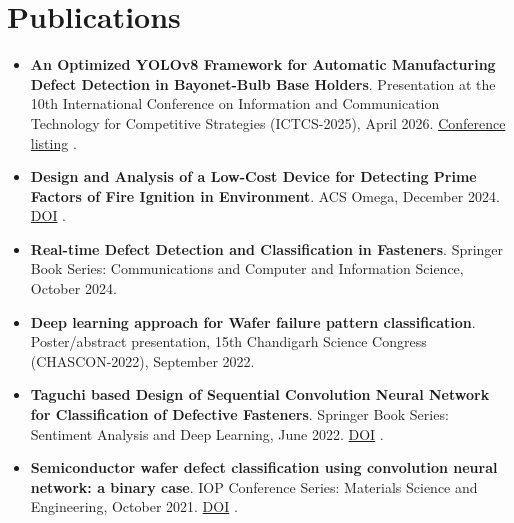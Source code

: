 \documentclass[a4paper,11pt]{article}
\newif\ifCVShowLinkIcons
\newcommand{\cvExternalLinkIcon}{}
\renewcommand{\cvExternalLinkIcon}{\raisebox{.15ex}{\footnotesize\faExternalLink*}}
\let\hrefWithoutArrow\href
\renewcommand{\href}[2]{%
  \hrefWithoutArrow{#1}{#2\ifCVShowLinkIcons\hspace{0.12em}\cvExternalLinkIcon\fi}%
}
\newcommand{\cvbullet}[1]{\item #1}
\begin{document}
\section*{Publications}
\begin{itemize}
  \cvbullet{\textbf{An Optimized YOLOv8 Framework for Automatic Manufacturing Defect Detection in Bayonet-Bulb Base Holders}. Presentation at the 10th International Conference on Information and Communication Technology for Competitive Strategies (ICTCS-2025), April 2026. \href{https://10thictcs2025.sched.com/event/2Cqon/an-optimized-yolov8-framework-for-automatic-manufacturing-defect-detection-in-bayonet-bulb-base-holders}{Conference listing}.}
  \cvbullet{\textbf{Design and Analysis of a Low-Cost Device for Detecting Prime Factors of Fire Ignition in Environment}. ACS Omega, December 2024. \href{https://doi.org/10.1021/acsomega.4c07465}{DOI}.}
  \cvbullet{\textbf{Real-time Defect Detection and Classification in Fasteners}. Springer Book Series: Communications and Computer and Information Science, October 2024.}
  \cvbullet{\textbf{Deep learning approach for Wafer failure pattern classification}. Poster/abstract presentation, 15th Chandigarh Science Congress (CHASCON-2022), September 2022.}
  \cvbullet{\textbf{Taguchi based Design of Sequential Convolution Neural Network for Classification of Defective Fasteners}. Springer Book Series: Sentiment Analysis and Deep Learning, June 2022. \href{https://doi.org/10.1007/978-981-19-5443-6_39}{DOI}.}
  \cvbullet{\textbf{Semiconductor wafer defect classification using convolution neural network: a binary case}. IOP Conference Series: Materials Science and Engineering, October 2021. \href{https://doi.org/10.1088/1757-899X/1225/1/012060}{DOI}.}
\end{itemize}
\end{document}

